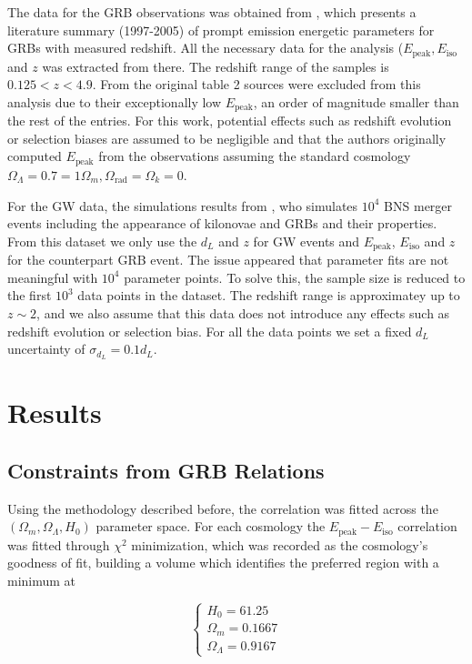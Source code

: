 \documentclass[
    aps,
    prd,
    twocolumn,
    nofootinbib,
    floatfix,
    superscriptaddress
]{revtex4-2}
\begin{document}
The data for the GRB observations was obtained from \cite{ghiarlanda2008}, which presents a literature summary (1997-2005) of prompt emission energetic parameters for GRBs with measured redshift. All the necessary data for the analysis ($E_\text{peak}, E_\text{iso}$ and $z$ was extracted from there. The redshift range of the samples is $0.125<z<4.9$. From the original table 2 sources were excluded from this analysis due to their exceptionally low $E_\text{peak}$, an order of magnitude smaller than the rest of the entries. For this work, potential effects such as redshift evolution or selection biases are assumed to be negligible and that the authors originally computed $E_\text{peak}$ from the observations assuming the standard cosmology $\Omega_\Lambda = 0.7 = 1 \Omega_m, \Omega_\text{rad} = \Omega_k = 0$.

For the GW data, the simulations results from \cite{colombo2025}, who simulates $10^4$ BNS merger events including the appearance of kilonovae and GRBs and their properties. From this dataset we only use the $d_L$ and $z$ for GW events and $E_\text{peak}$, $E_\text{iso}$ and $z$ for the counterpart GRB event. The issue appeared that parameter fits are not meaningful with $10^4$ parameter points. To solve this, the sample size is reduced to the first $10^3$ data points in the dataset. The redshift range is approximatey up to $z\sim2$, and we also assume that this data does not introduce any effects such as redshift evolution or selection bias. For all the data points we set a fixed $d_L$ uncertainty of $\sigma_{d_L} = 0.1 d_L$.

\section{Results}

\subsection{Constraints from GRB Relations}

Using the methodology described before, the correlation was fitted across the $(\Omega_m, \Omega_\Lambda, H_0)$ parameter space. For each cosmology the $E_\text{peak}-E_\text{iso}$ correlation was fitted through $\chi^2$ minimization, which was recorded as the cosmology's goodness of fit, building a volume which identifies the preferred region with a minimum at

$$
\begin{cases}
	H_0 = 61.25 \\
	\Omega_m = 0.1667 \\
	\Omega_\Lambda = 0.9167
\end{cases}
$$
\end{document}
